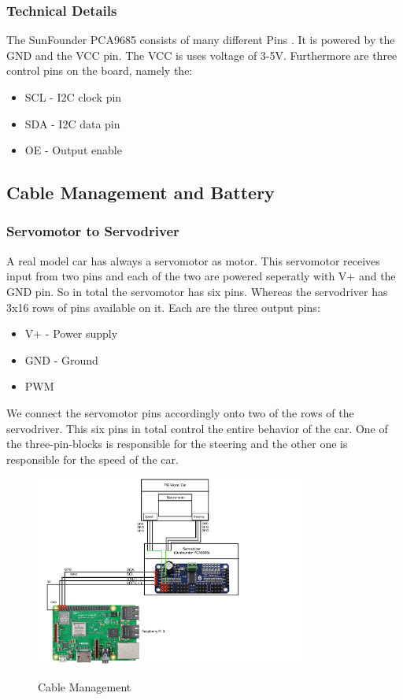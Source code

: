 \documentclass[journal]{IEEEtran}
\begin{document}
\subsubsection{Technical Details}
The SunFounder PCA9685 consists of many different Pins \cite{servo}. It is powered by the GND and the VCC pin. The VCC is uses voltage of 3-5V. Furthermore are three control pins on the board, namely the:

\begin{itemize}
\item SCL - I2C clock pin
\item SDA - I2C data pin 
\item OE - Output enable 
\end{itemize}

\subsection{Cable Management and Battery}
\subsubsection{Servomotor to Servodriver}
A real model car has always a servomotor as motor. This servomotor receives input from two pins and each of the two are powered seperatly with V+ and the GND pin. 
So in total the servomotor has six pins. Whereas the servodriver has 3x16 rows of pins available on it. Each are the three output pins:

\begin{itemize}
\item V+ - Power supply
\item GND - Ground
\item PWM
\end{itemize}

We connect the servomotor pins accordingly onto two of the rows of the servodriver. This six pins in total control the entire behavior of the car. One of the three-pin-blocks is responsible for the steering and the other one is responsible for the speed of the car. \\

\begin{figure}
  \begin{center}
  \includegraphics[width=3.5in]{photo/ebene2.pdf}\\
  \caption{Cable Management}\label{ebene2}
  \end{center}
\end{figure}
\end{document}
